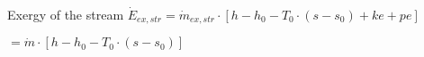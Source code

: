 Exergy of the stream \( \dot{E}_{ex,str} = \dot{m}_{ex,str} \cdot \left[ h - h_0 - T_0 \cdot (s - s_0) + ke + pe \right] \)  

\( = \dot{m} \cdot \left[ h - h_0 - T_0 \cdot (s - s_0) \right] \)